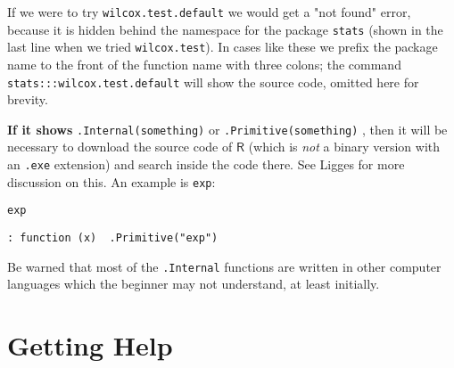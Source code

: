 If we were to try \texttt{wilcox.test.default} we would get a "not found"
error, because it is hidden behind the namespace for the package
\texttt{stats} \cite{stats} (shown in the last line when we tried
\texttt{wilcox.test}). In cases like these we prefix the package name to the
front of the function name with three colons; the command
\texttt{stats:::wilcox.test.default} will show the source code, omitted here
for brevity.

\textbf{If it shows} \texttt{.Internal(something)}
 or \texttt{.Primitive(something)}
, then it will be necessary to
download the source code of \(\mathsf{R}\) (which is \emph{not} a binary
version with an \texttt{.exe} extension) and search inside the code
there. See Ligges \cite{Ligges2006} for more discussion on this. An
example is \texttt{exp}:

\begin{verbatim}
exp
\end{verbatim}

\begin{verbatim}
: function (x)  .Primitive("exp")
\end{verbatim}

Be warned that most of the \texttt{.Internal} functions are written in other
computer languages which the beginner may not understand, at least
initially.

\section{Getting Help}
\label{sec-2-4}


